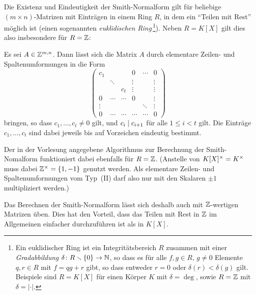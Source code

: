 \begin{remark}
  Die Existenz und Eindeutigkeit der Smith-Normalform gilt für beliebige $(m \times n)$-Matrizen mit Einträgen in einem Ring $R$, in dem ein \enquote{Teilen mit Rest} möglich ist (einen sogenannten \emph{euklidischen Ring}\,\footnote{
  Ein euklidischer Ring ist ein Integritätsbereich $R$ zusammen mit einer \emph{Gradabbildung} $\delta \colon R \smallsetminus \{0\} \to \mathbb{N}$, so dass es für alle $f, g \in R$, $g \neq 0$ Elemente $q , r \in R$ mit $f = qg + r$ gibt, so dass entweder $r = 0$ oder $\delta(r) < \delta(g)$ gilt.
  Beispiele sind $R = K[X]$ für einen Körper $K$ mit $\delta = \deg$, sowie $R = \mathbb{Z}$ mit $\delta = |\cdot|$.}).
  Neben $R = K[X]$ gilt dies also insbesondere für $R = \mathbb{Z}$:
  
  \begin{theorem}
    Es sei $A \in \mathbb{Z}^{m, n}$.
    Dann lässt sich die Matrix $A$ durch elementare Zeilen- und Spaltenumformungen in die Form
    \[
      \begin{pmatrix}
        c_1     &         &         & 0       & \cdots  & 0       \\
                & \ddots  &         & \vdots  &         & \vdots  \\
                &         & c_t     & \vdots  &         & \vdots  \\
        0       & \cdots  & \cdots  & 0       &         & \vdots  \\
        \vdots  &         &         &         & \ddots  & \vdots  \\
        0       & \cdots  & \cdots  & \cdots  & \cdots  & 0
      \end{pmatrix}
    \]
    bringen, so dass $c_1, \dotsc, c_t \neq 0$ gilt, und $c_i \mathrel{|} c_{i+1}$ für alle $1 \leq i < t$ gilt.
    Die Einträge $c_1, \dotsc, c_t$ sind dabei jeweils bis auf Vorzeichen eindeutig bestimmt.
  \end{theorem}
  
  Der in der Vorlesung angegebene Algorithmus zur Berechnung der Smith-Nomalform funktioniert dabei ebenfalls für $R = \mathbb{Z}$.
  (Anstelle von $K[X]^\times = K^\times$ muss dabei $\mathbb{Z}^\times = \{1, -1\}$ genutzt werden.
  Als elementare Zeilen- und Spaltenumformungen vom Typ~(II) darf also nur mit den Skalaren $\pm 1$ multipliziert werden.)
  
  Das Berechnen der Smith-Normalform lässt sich deshalb auch mit $\mathbb{Z}$-wertigen Matrizen üben.
  Dies hat den Vorteil, dass das Teilen mit Rest in $\mathbb{Z}$ im Allgemeinen einfacher durchzuführen ist als in $K[X]$.
\end{remark}

